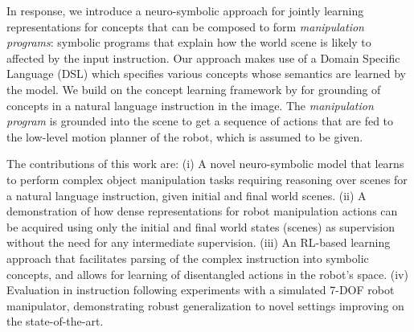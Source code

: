 In response, we introduce a neuro-symbolic approach for jointly learning representations for concepts that can be composed to form \emph{manipulation programs}: symbolic programs that explain how the world scene is likely to affected by the input instruction. Our approach makes use of a Domain Specific Language (DSL) which specifies various concepts whose semantics are learned by the model. 
%
We build on the concept learning framework by \cite{Mao2019NeuroSymbolic} for grounding of concepts in a natural language instruction in the image. The \emph{manipulation program} is grounded into the scene to get a sequence of actions that are fed to the low-level motion planner of the robot, which is assumed to be given.  







The contributions of this work are: 
%
(i) A novel neuro-symbolic model that learns 
to perform complex object manipulation tasks requiring reasoning over scenes for a natural language instruction, given initial 
and final world scenes.  
%
(ii) A demonstration of how dense representations for robot manipulation actions 
can be acquired using only the initial and final world states (scenes) as supervision without the need for any intermediate supervision. 
%
(iii) An RL-based learning approach that facilitates parsing of the complex instruction into symbolic concepts, and allows for learning of disentangled actions in the robot's space. 
%
(iv) Evaluation in instruction following experiments with a simulated 7-DOF robot manipulator, demonstrating robust generalization to novel settings improving on the state-of-the-art. 


